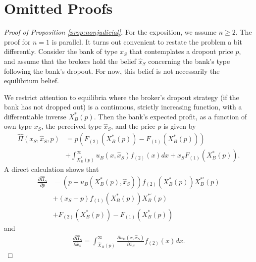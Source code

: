 \documentclass[11pt,twopage]{article}
\begin{document}
\section{Omitted Proofs}
\begin{proof}[Proof of Proposition \ref{prop:nonjudicial}]
  For the exposition, we assume $n \geq 2$. The proof for $n=1$ is
  parallel. It turns out convenient to restate the problem a bit
  differently. Consider the bank of type $x_S$ that contemplates a
  dropout price $p$, and assume that the brokers hold the belief $\hat
  x_S$ concerning the bank's type following the bank's dropout. For
  now, this belief is not necessarily the equilibrium belief.

  We restrict attention to equilibria where the broker's dropout
  strategy (if the bank has not dropped out) is a continuous, strictly
  increasing function, with a differentiable inverse $X_B^*(p)$. Then
  the bank's expected profit, as a function of own type $x_S$, the
  perceived type $\hat x_S$, and the price $p$ is given by
  \begin{align}
    \hat \Pi(x_S,\hat x_S,p) &= p (F_{(2)}(X_B^*(p)) - F_{(1)}(X_B^*(p)))\nonumber\\
    &+\int_{ X_B^*(p)}^{\infty} u_B(x,\hat x_S) f_{(2)}(x)dx +x_S
    F_{(1)}(X_B^*(p)).
    \label{eq:PiS}
  \end{align}
  A direct calculation shows that
  \begin{align} \frac{\partial \hat \Pi_S}{\partial p} &=
    (p-u_B(X_B^*(p),\hat x_S)) f_{(2)}(X_B^*(p))X_B^{*'}(p) \nonumber
    \\
    &+(x_S - p) f_{(1)}(X_B^*(p))X_B^{*'}(p) \nonumber
    \\
    &+F_{(2)}(X_B^*(p)) - F_{(1)}(X_B^*(p))
    \label{eq:sp}
  \end{align}
  and
  \begin{align} \frac{\partial \hat \Pi_S}{\partial \hat x_S} =
    \int_{\hat X_B(p)}^{\infty} \frac{\partial u_B(x,\hat
      x_S)}{\partial \hat x_S} f_{(2)}(x)dx .\end{align}



\end{proof}
\end{document}
